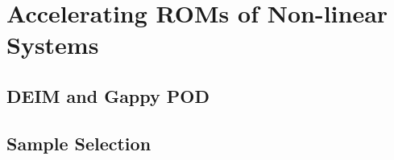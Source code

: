 \section{Accelerating ROMs of Non-linear Systems}

\subsection{DEIM and Gappy POD}

\subsection{Sample Selection}